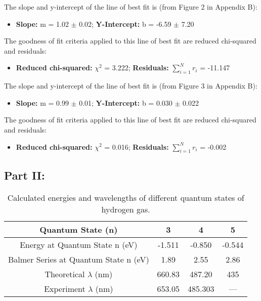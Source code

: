 \documentclass[10pt, letterpaper, twoside]{article}
\begin{document}
The slope and y-intercept of the line of best fit is (from Figure 2 in Appendix B):

\begin{itemize}
    \item \textbf{Slope:} m = 1.02 $\pm$ 0.02;  \textbf{Y-Intercept:} b = -6.59 $\pm$ 7.20
\end{itemize}

The goodness of fit criteria applied to this line of best fit are reduced chi-squared and residuals:

\begin{itemize}
    \item \textbf{Reduced chi-squared:} $\chi^2$ = 3.222; \textbf{Residuals:} $\sum_{i=1}^N r_i$ = -11.147
\end{itemize}

The slope and y-intercept of the line of best fit is (from Figure 3 in Appendix B):

\begin{itemize}
    \item \textbf{Slope:} m = 0.99 $\pm$ 0.01; \textbf{Y-Intercept:} b = 0.030 $\pm$ 0.022
\end{itemize}

The goodness of fit criteria applied to this line of best fit are reduced chi-squared and residuals:

\begin{itemize}
    \item \textbf{Reduced chi-squared:} $\chi^2$ = 0.016; \textbf{Residuals:} $\sum_{i=1}^N r_i$ = -0.002
\end{itemize}

\subsection{Part II:}
\vspace{-1em}
\begin{table}[!ht]
    \centering
\begin{tabular}{|c|c|c|c|}
        \hline
        Quantum State (n) & 3 & 4 & 5 \\
        \hline
        Energy at Quantum State n (eV) & -1.511 & -0.850 & -0.544 \\
        \hline
        Balmer Series at Quantum State n (eV) & 1.89 & 2.55 & 2.86\\
        \hline
        Theoretical $\lambda$ (nm) & 660.83 & 487.20 & 435 \\
        \hline
        Experiment $\lambda$ (nm) & 653.05 & 485.303 & --- \\
        \hline
    \end{tabular}
    \caption{Calculated energies and wavelengths of different quantum states of hydrogen gas.}
    \label{tab:my_label}
\end{table}
    
\end{document}

